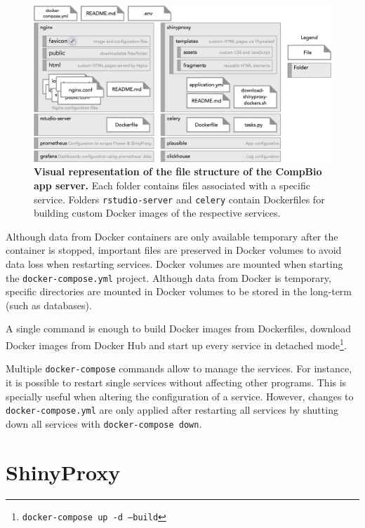 \begin{figure}[!h]
  \includegraphics[width=1\textwidth]{images/app-server/file-structure}
  \centering
  \caption[App server's file structure]{\textbf{Visual representation of the file structure of the CompBio app server.} Each folder contains files associated with a specific service. Folders \texttt{rstudio-server} and \texttt{celery} contain Dockerfiles for building custom Docker images of the respective services.}
  \label{fig:file-structure}
\end{figure}

Although data from Docker containers are only available temporary after the container is stopped, important files are preserved in Docker volumes to avoid data loss when restarting services. Docker volumes are mounted when starting the \texttt{docker-compose.yml} project. Although data from Docker is temporary, specific directories are mounted in Docker volumes to be stored in the long-term (such as databases).

A single command is enough to build Docker images from Dockerfiles, download Docker images from Docker Hub and start up every service in detached mode\footnote{\texttt{docker-compose up -d --build}}.

Multiple \texttt{docker-compose} commands allow to manage the services. For instance, it is possible to restart single services without affecting other programs. This is specially useful when altering the configuration of a service. However, changes to \texttt{docker-compose.yml} are only applied after restarting all services by shutting down all services with \texttt{docker-compose down}.


\section{ShinyProxy}

